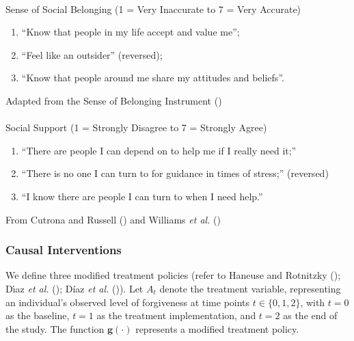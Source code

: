 \documentclass[
  single column]{article}
\makeatletter
\let\oldparagraph\paragraph
\renewcommand{\paragraph}{
    \@ifstar
      \xxxParagraphStar
      \xxxParagraphNoStar
  }
\newcommand{\xxxParagraphStar}[1]{\oldparagraph*{#1}\mbox{}}
\newcommand{\xxxParagraphNoStar}[1]{\oldparagraph{#1}\mbox{}}
\providecommand{\tightlist}{%
  \setlength{\itemsep}{0pt}\setlength{\parskip}{0pt}}\usepackage{longtable,booktabs,array}
\makeatother
\begin{document}
\paragraph{Sense of Social Belonging (1 = Very Inaccurate to 7 = Very
Accurate)}\label{sense-of-social-belonging-1-very-inaccurate-to-7-very-accurate}

\begin{enumerate}
\def\labelenumi{(\arabic{enumi})}
\tightlist
\item
  ``Know that people in my life accept and value me'';
\item
  ``Feel like an outsider'' (reversed);
\item
  ``Know that people around me share my attitudes and beliefs''.
\end{enumerate}

Adapted from the Sense of Belonging Instrument
()

\paragraph{Social Support (1 = Strongly Disagree to 7 = Strongly
Agree)}\label{social-support-1-strongly-disagree-to-7-strongly-agree}

\begin{enumerate}
\def\labelenumi{(\arabic{enumi})}
\tightlist
\item
  ``There are people I can depend on to help me if I really need it;''
\item
  ``There is no one I can turn to for guidance in times of stress;''
  (reversed)
\item
  ``I know there are people I can turn to when I need help.''
\end{enumerate}

From Cutrona and Russell () and Williams
\emph{et al.} ()

\subsubsection{Causal Interventions}\label{causal-interventions}

We define three modified treatment policies (refer to Haneuse and
Rotnitzky (); Dı́az \emph{et
al.} (); Díaz \emph{et al.}
()). Let \(A_t\) denote the treatment
variable, representing an individual's observed level of forgiveness at
time points \(t \in \{0,1,2\}\), with \(t=0\) as the baseline, \(t=1\)
as the treatment implementation, and \(t=2\) as the end of the study.
The function \(\mathbf{g}(\cdot)\) represents a modified treatment
policy.
\end{document}

